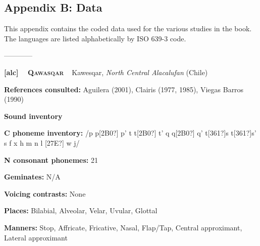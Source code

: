 
\clearpage\setcounter{page}{1}\subsection[Appendix B: Data]{Appendix B: Data}
\begin{styleBody}
This appendix contains the coded data used for the various studies in the book. The languages are listed alphabetically by ISO 639-3 code.
\end{styleBody}

\begin{styleBody}
————
\end{styleBody}

\begin{styleBody}
\textbf{[alc] }\ \ \textbf{\textsc{Qawasqar}}\textbf{\ \ }Kawesqar, \textit{North Central Alacalufan} (Chile)
\end{styleBody}

\begin{styleBody}
\textbf{References consulted: }Aguilera (2001), Clairis (1977, 1985), Viegas Barros (1990)
\end{styleBody}

\begin{styleBody}
\textbf{Sound inventory}
\end{styleBody}

\begin{styleBody}
\textbf{C phoneme inventory:} /p p[2B0?] p’ t t[2B0?] t’ q q[2B0?] q’ t[361?]s t[361?]s’ s f x h m n l [27E?] w j/
\end{styleBody}

\begin{styleBody}
\textbf{N consonant phonemes:} 21
\end{styleBody}

\begin{styleBody}
\textbf{Geminates:} N/A
\end{styleBody}

\begin{styleBody}
\textbf{Voicing contrasts:} None
\end{styleBody}

\begin{styleBody}
\textbf{Places:} Bilabial, Alveolar, Velar, Uvular, Glottal
\end{styleBody}

\begin{styleBody}
\textbf{Manners:} Stop, Affricate, Fricative, Nasal, Flap/Tap, Central approximant, Lateral approximant
\end{styleBody}

